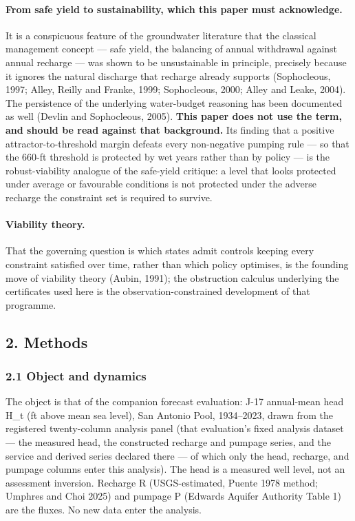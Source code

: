 \documentclass[11pt]{article}
\begin{document}
\paragraph{From safe yield to sustainability, which this paper must acknowledge.} It is a
conspicuous feature of the groundwater literature that the classical management concept ---
safe yield, the balancing of annual withdrawal against annual recharge --- was shown to be
unsustainable in principle, precisely because it ignores the natural discharge that recharge
already supports (Sophocleous, 1997; Alley, Reilly and Franke, 1999; Sophocleous, 2000; Alley
and Leake, 2004). The persistence of the underlying water-budget reasoning has been
documented as well (Devlin and Sophocleous, 2005). \textbf{This paper does not use the term,
and should be read against that background.} Its finding that a positive attractor-to-threshold
margin defeats every non-negative pumping rule --- so that the 660-ft threshold is protected
by wet years rather than by policy --- is the robust-viability analogue of the safe-yield
critique: a level that looks protected under average or favourable conditions is not
protected under the adverse recharge the constraint set is required to survive.

\paragraph{Viability theory.} That the governing question is which states admit controls
keeping every constraint satisfied over time, rather than which policy optimises, is the
founding move of viability theory (Aubin, 1991); the obstruction calculus underlying the
certificates used here is the observation-constrained development of that programme.

\subsection{2. Methods}\label{edw-methods}

\subsubsection{2.1 Object and dynamics}\label{edw-object-and-dynamics}

The object is that of the companion forecast evaluation: J-17
annual-mean head H\_t (ft above mean sea level), San Antonio Pool,
1934--2023, drawn from the registered twenty-column analysis panel
(that evaluation's fixed analysis dataset --- the measured head, the
constructed recharge and pumpage series, and the service and derived
series declared there --- of which only the head, recharge, and pumpage
columns enter this analysis). The
head is a measured well level, not an assessment inversion. Recharge R
(USGS-estimated, Puente 1978 method; Umphres and Choi 2025) and pumpage
P (Edwards Aquifer Authority Table 1) are the fluxes. No new data enter
the analysis.
\end{document}
